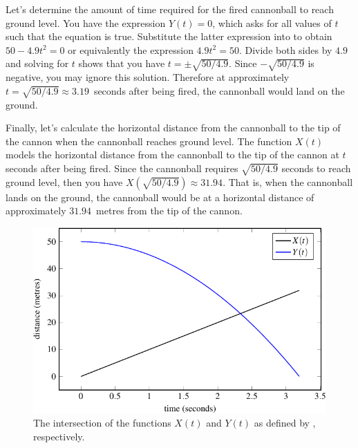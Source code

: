 \documentclass[a4paper,oneside,12pt]{article}
\begin{document}
\begin{problem}
{\begin{solution}
Let's determine the amount of time required for the fired cannonball
to reach ground level.  You have the expression $Y(t) = 0$, which asks
for all values of $t$ such that the equation is true.  Substitute the
latter expression into
 to obtain
$50 - 4.9 t^2 = 0$ or equivalently the expression $4.9t^2 = 50$.
Divide both sides by $4.9$ and solving for $t$ shows that you have
$t = \pm\sqrt{50 / 4.9}$.  Since $-\sqrt{50 / 4.9}$ is negative, you
may ignore this solution.  Therefore at approximately
$t = \sqrt{50 / 4.9} \approx 3.19$~seconds after being fired, the
cannonball would land on the ground.

Finally, let's calculate the horizontal distance from the cannonball
to the tip of the cannon when the cannonball reaches ground level.
The function $X(t)$ models the horizontal distance from the cannonball
to the tip of the cannon at $t$ seconds after being fired.  Since the
cannonball requires $\sqrt{50 / 4.9}$ seconds to reach ground level,
then you have $X(\sqrt{50 / 4.9}) \approx 31.94$.  That is, when the
cannonball lands on the ground, the cannonball would be at a
horizontal distance of approximately $31.94$~metres from the tip of
the cannon.

\begin{figure}[!htbp]
\centering
\includegraphics[scale=1.1]{image/13/cannonball-intersection.pdf}
\caption{%
  The intersection of the functions $X(t)$ and $Y(t)$ as defined by
  ,
  respectively.
}
\label{fig:trigonometric:cannonball_intersection}
\end{figure}


\end{solution}}
\end{problem}
\end{document}
